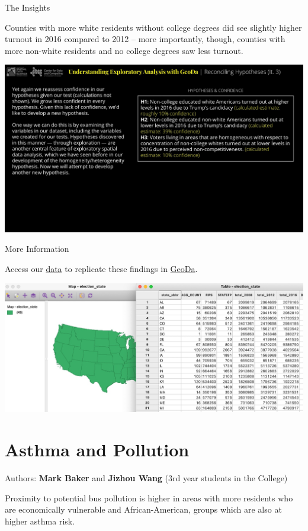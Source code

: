 \documentclass[
]{book}
\begin{document}
The Insights

Counties with more white residents without college degrees did see slightly higher turnout in 2016 compared to 2012 -- more importantly, though, counties with more non-white residents and no college degrees saw less turnout.

\includegraphics{images/elections5.jpg}

More Information

Access our \href{https://uchicago.box.com/s/m7lf4ldukuh3b6zle3cqjqd437vb5yqm}{data} to replicate these findings in \href{https://geodacenter.github.io}{GeoDa}.

\includegraphics{images/elections6.jpg}

\hypertarget{asthma-and-pollution}{%
\section{Asthma and Pollution}\label{asthma-and-pollution}}

Authors: \textbf{Mark Baker} and \textbf{Jizhou Wang} (3rd year students in the College)

Proximity to potential bus pollution is higher in areas with more residents who are economically vulnerable and African-American, groups which are also at higher asthma risk.
\end{document}
